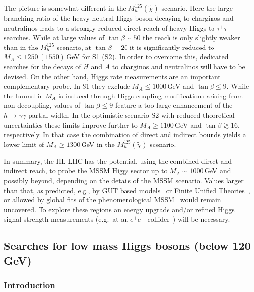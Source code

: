 \documentclass[../report.tex]{subfiles}
\begin{document}
The picture is somewhat different in the $M_h^{125}(\tilde{\chi})$ scenario. Here the large branching ratio of the heavy neutral Higgs boson decaying to charginos and neutralinos leads to a strongly reduced direct reach of heavy Higgs to $\tau^+\tau^-$ searches. While at large values of $\tan\beta \sim 50$  the reach is only slightly weaker than in the $M_h^{125}$ scenario, at $\tan\beta = 20$ it is significantly reduced to $M_A \le 1250~(1550)$\,GeV for S1 (S2). In order to overcome this, dedicated searches for the decays of $H$ and $A$ to charginos and neutralinos will have to be devised. On the other hand, Higgs rate measurements are an important complementary probe. In S1 they exclude
$M_A \le 1000$\,GeV and $\tan\beta \le 9$. While the bound in $M_A$
is induced through Higgs coupling modifications arising from
non-decoupling, values of $\tan\beta\le 9$ feature a too-large enhancement of the $h\to \gamma\gamma$ partial width. In the optimistic scenario S2 with reduced theoretical uncertainties these limits improve further to $M_A \ge 1100$\,GeV and $\tan\beta \gtrsim 16$, respectively.
In that case the combination of direct and indirect bounds yields
a lower limit of $M_A \ge 1300$\,GeV in the $M_h^{125}(\tilde{\chi})$ scenario.

In summary, the HL-LHC has the potential, using the combined direct and indirect reach, to probe the MSSM Higgs sector up to $M_A \sim 1000$\,GeV and possibly beyond, depending on the details of the MSSM scenario. Values larger than that, as predicted, e.g., by GUT based models~\cite{Buchmueller:2013rsa,Buchmueller:2014yva,Bechtle:2015nua,Bagnaschi:2016afc,Bagnaschi:2016xfg,Costa:2017gup} or Finite Unified Theories~\cite{Heinemeyer:2013nza,Heinemeyer:2018roq,Heinemeyer:2018zpw}, or allowed by global fits of the phenomenological MSSM~\cite{Bechtle:2016kui,Bagnaschi:2017tru} would remain uncovered. To explore these regions an energy upgrade and/or refined Higgs signal strength measurements (e.g.\ at an $e^+e^-$ collider~\cite{Moortgat-Picka:2015yla}) will be
necessary.  




\subsection{Searches for low mass Higgs bosons (below 120 GeV)}


\subsubsection{Introduction}\label{sec:intro}
\end{document}
